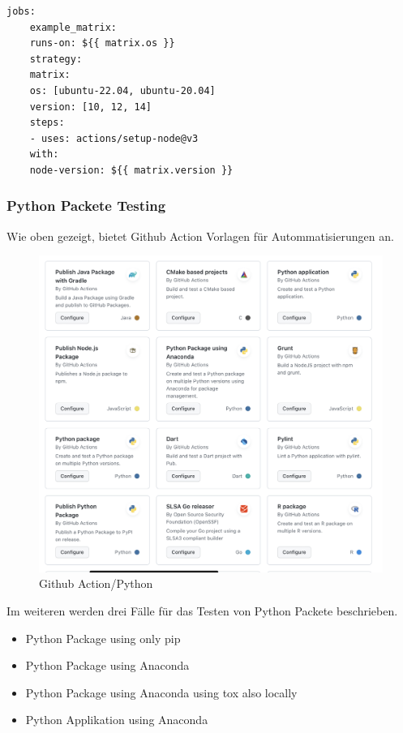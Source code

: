 \begin{lstlisting}[style=Config, caption={Multi Dimension Matrix}, captionpos=b]
	jobs:
	example_matrix:
	runs-on: ${{ matrix.os }}
	strategy:
	matrix:
	os: [ubuntu-22.04, ubuntu-20.04]
	version: [10, 12, 14]
	steps:
	- uses: actions/setup-node@v3
	with:
	node-version: ${{ matrix.version }}
\end{lstlisting}


\subsubsection{Python Packete Testing}
Wie oben gezeigt, bietet Github Action Vorlagen für Autommatisierungen an.

\begin{figure}[H]
	\centering
	\includegraphics[scale = 0.2]{attachment/chapter_2/Scc103}
	\caption{Github Action/Python}
\end{figure}

Im weiteren werden drei Fälle für das Testen von Python Packete beschrieben.
\begin{itemize}
	\item Python Package using only pip
	\item Python Package using Anaconda
	\item Python Package using Anaconda using tox also locally
	\item Python Applikation using Anaconda
\end{itemize}

